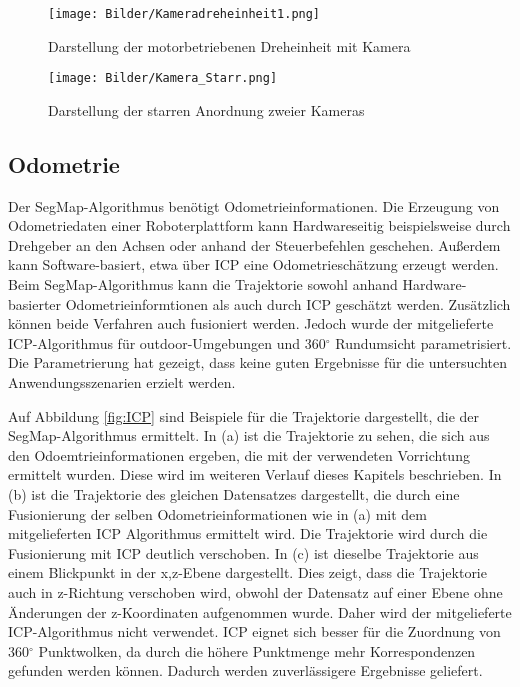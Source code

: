 \begin{figure}
	\centering
	\begin {minipage}[t]{0.45\linewidth}
	\centering
	\texttt{[image: Bilder/Kameradreheinheit1.png]}
	\caption{Darstellung der motorbetriebenen Dreheinheit mit Kamera}
	\label{fig:Dreheinheit}
	\label{fig:Kamera_Starr}
\end{minipage}
\hfill
 \begin{minipage}[t]{0.45\linewidth}
	\centering
	\texttt{[image: Bilder/Kamera\_Starr.png]}
	\caption{Darstellung der starren Anordnung zweier Kameras}
	\label{fig:Kamera_Starr}
\end{minipage}
\end{figure}

\subsection[Odometrie (Kopp)]{Odometrie}

Der SegMap-Algorithmus benötigt Odometrieinformationen. Die Erzeugung von Odometriedaten einer Roboterplattform kann Hardwareseitig beispielsweise durch Drehgeber an den Achsen oder anhand der Steuerbefehlen geschehen. Außerdem kann Software-basiert, etwa über ICP eine Odometrieschätzung erzeugt werden. Beim SegMap-Algorithmus kann die Trajektorie sowohl anhand Hardware-basierter Odometrieinformtionen als auch durch ICP geschätzt werden. Zusätzlich können beide Verfahren auch fusioniert werden. Jedoch wurde der mitgelieferte ICP-Algorithmus für outdoor-Umgebungen und 360$^\circ$ Rundumsicht parametrisiert. Die Parametrierung hat gezeigt, dass keine guten Ergebnisse für die untersuchten Anwendungsszenarien erzielt werden. 

Auf Abbildung \ref{fig:ICP} sind Beispiele für die Trajektorie dargestellt, die der SegMap-Algorithmus ermittelt. In (a) ist die Trajektorie zu sehen, die sich aus den Odoemtrieinformationen ergeben, die mit der verwendeten Vorrichtung ermittelt wurden. Diese wird im weiteren Verlauf dieses Kapitels beschrieben. In (b) ist die Trajektorie des gleichen Datensatzes dargestellt, die durch eine Fusionierung der selben Odometrieinformationen wie in (a) mit dem mitgelieferten ICP Algorithmus ermittelt wird. Die Trajektorie wird durch die Fusionierung mit ICP deutlich verschoben. In (c) ist dieselbe Trajektorie aus einem Blickpunkt in der x,z-Ebene dargestellt. Dies zeigt, dass die Trajektorie auch in z-Richtung verschoben wird, obwohl der Datensatz auf einer Ebene ohne Änderungen der z-Koordinaten aufgenommen wurde. Daher wird der mitgelieferte ICP-Algorithmus nicht verwendet. ICP eignet sich besser für die Zuordnung von 360$^\circ$ Punktwolken, da durch die höhere Punktmenge mehr Korrespondenzen gefunden werden können. Dadurch werden zuverlässigere Ergebnisse geliefert.


